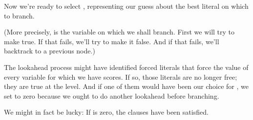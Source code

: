  Now we're ready to select , representing
our guess about
the best literal on which to branch.

(More precisely,  is the variable on which we shall
branch. First we will try to make  true. If that fails,
we'll try to make it false. And if that fails, we'll backtrack
to a previous node.)

The lookahead process might have identified forced literals that
force the value of every variable for which we have  scores.
If so, those literals are no longer free;
they are true at the  level. And if one of them would
have been our choice for , we set  to zero
because
we ought to do another lookahead before branching.

We might in fact
be lucky: If  is zero, the clauses have been satisfied.

